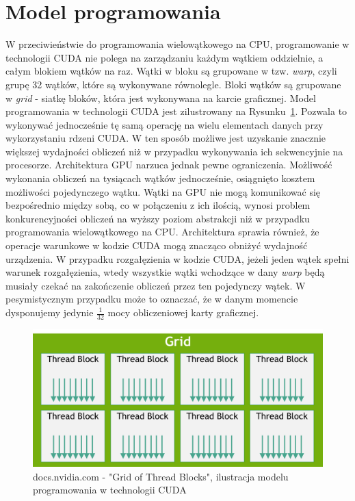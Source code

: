 \section{Model programowania}
W przeciwieństwie do programowania wielowątkowego na CPU, programowanie w technologii CUDA nie polega na zarządzaniu każdym wątkiem oddzielnie, a całym blokiem wątków na raz. Wątki w bloku są grupowane w tzw. \textit{warp}, czyli grupę 32 wątków, które są wykonywane równolegle. Bloki wątków są grupowane w \textit{grid} - siatkę bloków, która jest wykonywana na karcie graficznej. Model programowania w technologii CUDA jest zilustrowany na Rysunku~\ref{fig:Grid of Thread Blocks}. Pozwala to wykonywać jednocześnie tę samą operację na wielu elementach danych przy wykorzystaniu rdzeni CUDA. W ten sposób możliwe jest uzyskanie znacznie większej wydajności obliczeń niż w przypadku wykonywania ich sekwencyjnie na procesorze. Architektura GPU narzuca jednak pewne ograniczenia. Możliwość wykonania obliczeń na tysiącach wątków jednocześnie, osiągnięto kosztem możliwości pojedynczego wątku. Wątki na GPU nie mogą komunikować się bezpośrednio między sobą, co w połączeniu z ich ilością, wynosi problem konkurencyjności obliczeń na wyższy poziom abstrakcji niż w przypadku programowania wielowątkowego na CPU. Architektura sprawia również, że operacje warunkowe w kodzie CUDA mogą znacząco obniżyć wydajność urządzenia. W przypadku rozgałęzienia w kodzie CUDA, jeżeli jeden wątek spełni warunek rozgałęzienia, wtedy wszystkie wątki wchodzące w dany \textit{warp} będą musiały czekać na zakończenie obliczeń przez ten pojedynczy wątek. W pesymistycznym przypadku może to oznaczać, że w danym momencie dysponujemy jedynie $\frac{1}{32}$ mocy obliczeniowej karty graficznej.
\begin{figure}[H]
    \centering
    \includegraphics[scale=0.5]{./fig/grid-of-thread-blocks.png}
    \caption{docs.nvidia.com - "Grid of Thread Blocks", ilustracja modelu programowania w technologii CUDA}
    \label{fig:Grid of Thread Blocks}
\end{figure}




